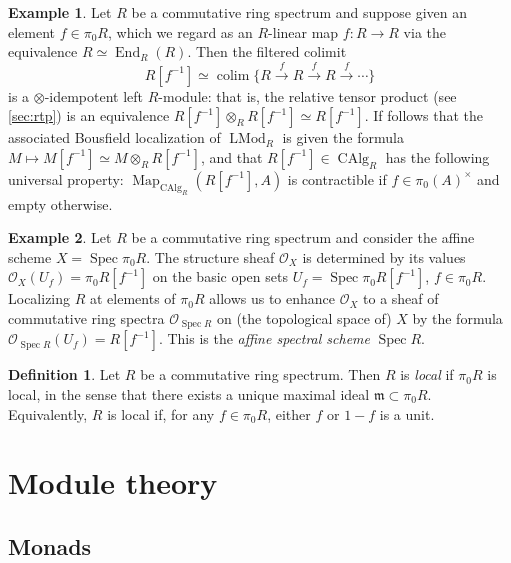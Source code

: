 \documentclass[12pt]{article}
\theoremstyle{definition}
\newtheorem{definition}{Definition}[subsection]
\newtheorem{example}{Example}[subsection]
\renewcommand{\O}{\mathcal{O}}
\newcommand{\too}{\longrightarrow}
\DeclareMathOperator{\LMod}{LMod}
\DeclareMathOperator{\CAlg}{CAlg}
\DeclareMathOperator{\End}{End}
\DeclareMathOperator{\Spec}{Spec}
\DeclareMathOperator{\Map}{Map}
\DeclareMathOperator{\colim}{colim}
\begin{document}
\begin{example}\label{eg:zar}
Let $R$ be a commutative ring spectrum and suppose given an element $f\in\pi_0 R$, which we regard as an $R$-linear map $f:R\to R$ via the equivalence $R\simeq\End_R(R)$.
Then the filtered colimit
\[
R[f^{-1}]\simeq\colim\{ R\overset{f}{\too} R\overset{f}{\too} R\overset{f}{\too}\cdots\}
\]
is a $\otimes$-idempotent left $R$-module: that is, the relative tensor product (see \autoref{sec:rtp}) is an equivalence $R[f^{-1}]\otimes_R R[f^{-1}]\simeq R[f^{-1}]$.
If follows that the associated Bousfield localization of $\LMod_R$ is given the formula $M\mapsto M[f^{-1}]\simeq M\otimes_R R[f^{-1}]$, and that $R[f^{-1}]\in\CAlg_R$ has the following universal property: $\Map_{\CAlg_R}(R[f^{-1}],A)$ is contractible if $f\in\pi_0(A)^\times$ and empty otherwise.
\end{example}
\begin{example}\label{eg:zars}
Let $R$ be a commutative ring spectrum and consider the affine scheme $X=\Spec\pi_0 R$. The structure sheaf $\O_{X}$ is determined by its values $\O_{X}(U_f)=\pi_0 R[f^{-1}]$ on the basic open sets $U_f=\Spec\pi_0 R[f^{-1}]$, $f\in\pi_0 R$.
Localizing $R$ at elements of $\pi_0 R$ allows us to enhance $\O_{X}$ to a sheaf of commutative ring spectra $\O_{\Spec R}$ on (the topological space of) $X$ by the formula $\O_{\Spec R}(U_f)=R[f^{-1}]$.
This is the {\em affine spectral scheme} $\Spec R$.
\end{example}

\begin{definition}
Let $R$ be a commutative ring spectrum.
Then $R$ is {\em local} if $\pi_0 R$ is local, in the sense that there exists a unique maximal ideal $\mathfrak{m}\subset\pi_0 R$.
Equivalently, $R$ is local if, for any $f\in\pi_0 R$, either $f$ or $1-f$ is a unit.
\end{definition}


\section{Module theory}\label{sec:mt}


\subsection{Monads}
\end{document}
